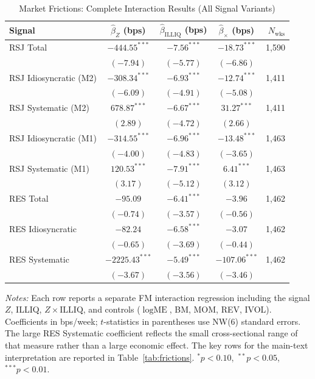 \documentclass[11pt,a4paper]{article}
\begin{document}
\begin{table}[!htbp]
\centering
\caption{Market Frictions: Complete Interaction Results (All Signal Variants)}
\label{tab:frictions_full}
\small
\begin{threeparttable}
\begin{tabular}{l c c c r}
\toprule
Signal
  & $\hat\beta_Z$ (bps) & $\hat\beta_{\text{ILLIQ}}$ (bps)
  & $\hat\beta_\times$ (bps) & $N_{\text{wks}}$ \\
\midrule
RSJ Total
  & $-444.55^{***}$ & $-7.56^{***}$ & $-18.73^{***}$ & 1{,}590 \\
  & $(-7.94)$ & $(-5.77)$ & $(-6.86)$ & \\[2pt]
RSJ Idiosyncratic (M2)
  & $-308.34^{***}$ & $-6.93^{***}$ & $-12.74^{***}$ & 1{,}411 \\
  & $(-6.09)$ & $(-4.91)$ & $(-5.08)$ & \\[2pt]
RSJ Systematic (M2)
  & $678.87^{***}$ & $-6.67^{***}$ & $31.27^{***}$ & 1{,}411 \\
  & $(2.89)$ & $(-4.72)$ & $(2.66)$ & \\[2pt]
RSJ Idiosyncratic (M1)
  & $-314.55^{***}$ & $-6.96^{***}$ & $-13.48^{***}$ & 1{,}463 \\
  & $(-4.00)$ & $(-4.83)$ & $(-3.65)$ & \\[2pt]
RSJ Systematic (M1)
  & $120.53^{***}$ & $-7.91^{***}$ & $6.41^{***}$ & 1{,}463 \\
  & $(3.17)$ & $(-5.12)$ & $(3.12)$ & \\[5pt]
RES Total
  & $-95.09$ & $-6.41^{***}$ & $-3.96$ & 1{,}462 \\
  & $(-0.74)$ & $(-3.57)$ & $(-0.56)$ & \\[2pt]
RES Idiosyncratic
  & $-82.24$ & $-6.58^{***}$ & $-3.07$ & 1{,}462 \\
  & $(-0.65)$ & $(-3.69)$ & $(-0.44)$ & \\[2pt]
RES Systematic
  & $-2225.43^{***}$ & $-5.49^{***}$ & $-107.06^{***}$ & 1{,}462 \\
  & $(-3.67)$ & $(-3.56)$ & $(-3.46)$ & \\
\bottomrule
\end{tabular}
\begin{tablenotes}
\footnotesize
\item \textit{Notes:} Each row reports a separate FM interaction regression including
the signal $Z$, ILLIQ, $Z\times\text{ILLIQ}$, and controls ($\log\text{ME}$, BM, MOM,
REV, IVOL). Coefficients in bps/week; $t$-statistics in parentheses use NW(6) standard
errors. The large RES Systematic coefficient reflects the small cross-sectional range of
that measure rather than a large economic effect. The key rows for the main-text
interpretation are reported in Table~\ref{tab:frictions}.
$^{*}p<0.10$,\ $^{**}p<0.05$,\ $^{***}p<0.01$.
\end{tablenotes}
\end{threeparttable}
\end{table}
\end{document}
